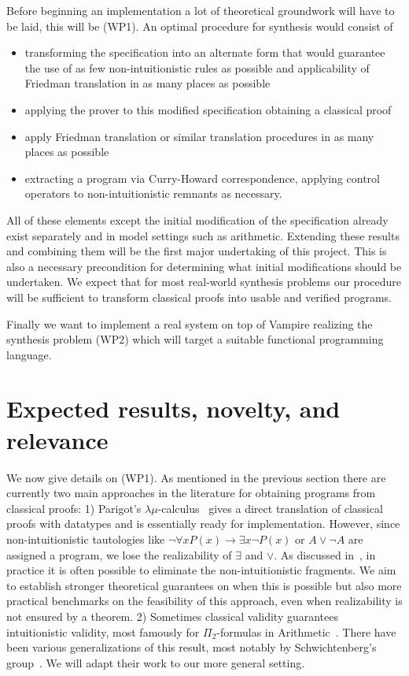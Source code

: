 \documentclass[a4paper,12pt]{article}
\begin{document}
	Before beginning an implementation a lot of theoretical groundwork will have to be laid, this will be (WP1). An optimal procedure for synthesis would consist of
	\begin{itemize}
		\item transforming the specification into an alternate form that would guarantee the use of as few non-intuitionistic rules as possible and applicability of Friedman translation in as many places as possible
		\item applying the prover to this modified specification obtaining a classical proof
		\item apply Friedman translation or similar translation procedures in as many places as possible
		\item extracting a program via Curry-Howard correspondence, applying control operators to non-intuitionistic remnants as necessary.
	\end{itemize}
	All of these elements except the initial modification of the specification already exist separately and in model settings such as arithmetic. Extending these results and combining them will be the first major undertaking of this project. This is also a necessary precondition for determining what initial modifications should be undertaken. We expect that for most real-world synthesis problems our procedure will be sufficient to transform classical proofs into usable and verified programs.
	
	Finally we want to implement a real system on top of Vampire realizing the synthesis problem (WP2) which will target a suitable functional programming language.
	
	\section{Expected results, novelty, and relevance}
	
	We now give details on (WP1). As mentioned in the previous section there are currently two main approaches in the literature for obtaining programs from classical proofs: 1) Parigot's $\lambda\mu$-calculus~\cite{Parigot1} gives a direct translation of classical proofs with datatypes and is essentially ready for implementation. However, since non-intuitionistic tautologies like $\neg\forall xP(x)\to \exists x\neg P(x)$ or $A\vee \neg A$ are assigned a program, we lose the realizability of $\exists$ and $\vee$. As discussed in~\cite{practical}, in practice it is often possible to eliminate the non-intuitionistic fragments. We aim to establish stronger theoretical guarantees on when this is possible but also more practical benchmarks on the feasibility of this approach, even when realizability is not ensured by a theorem. 2) Sometimes classical validity guarantees intuitionistic validity, most famously for $\Pi_2$-formulas in Arithmetic~\cite{Friedman}. There have been various generalizations of this result, most notably by Schwichtenberg's group~\cite{schwichtenberg}. We will adapt their work to our more general setting.
	
\end{document}

